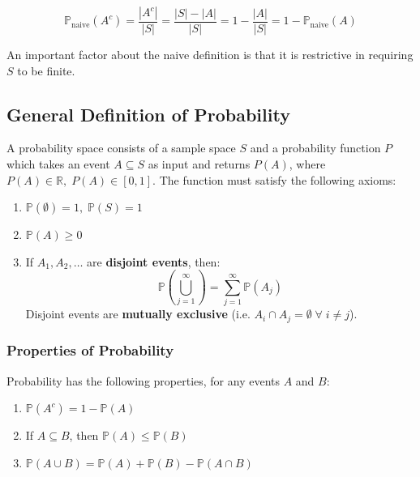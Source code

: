 \documentclass{article}
\begin{document}
\begin{equation*}
    \mathbb{P}_{\text{naive}}(A^{c}) = \frac{|A^{c}|}{|S|} = \frac{|S| - |A|}{|S|} = 1- \frac{|A|}{|S|} = 1 - \mathbb{P}_{\text{naive}}(A)
\end{equation*}

An important factor about the naive definition is that it is restrictive in requiring $S$ to be finite. 

\subsection{General Definition of Probability}

\begin{definition}
    A probability space consists of a sample space $S$ and a probability function $P$ which takes an event $A \subseteq S$ as input and returns $P(A)$, where $P(A) \in \mathbb{R}, \; P(A) \in [0, 1]$. The function must satisfy the following axioms:

    \begin{enumerate}
        \item $\mathbb{P}(\emptyset) = 1, \; \mathbb{P}(S) = 1$ 
        \item $\mathbb{P}(A) \geq 0$
        \item If $A_{1}, A_{2}, \dots$ are \textbf{disjoint events}, then: \begin{equation*}
            \mathbb{P} \left( \bigcup_{j=1}^{\infty} \right) = \sum_{j=1}^{\infty} \mathbb{P}(A_j)
        \end{equation*}
        \noindent Disjoint events are \textbf{mutually exclusive} (i.e. $A_i \cap A_j = \emptyset \; \forall \; i \neq j$).
    \end{enumerate}
\end{definition}

\subsubsection{Properties of Probability}
\begin{theorem}

Probability has the following properties, for any events $A$ and $B$: 

\begin{enumerate}
    \item $\mathbb{P}(A^{c}) = 1 - \mathbb{P}(A)$
    \item If $A \subseteq B$, then $\mathbb{P}(A) \leq \mathbb{P}(B)$
    \item $\mathbb{P}(A \cup B) = \mathbb{P}(A) + \mathbb{P} (B) - \mathbb{P}(A \cap B)$ 
\end{enumerate}
\end{theorem}
\end{document}
